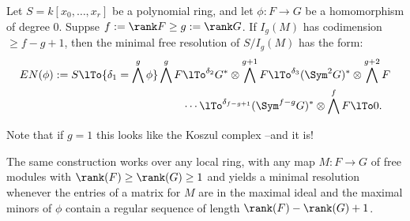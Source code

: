 \begin{theorem}\label{Eagon-Northcott}\label{E-N}
 Let $S = k[x_0,\dots, x_r]$ be a polynomial ring,  and let 
 $\phi: F  \to G$ be a homomorphism of degree 0. Suppse $f := \rank F\geq  g:= \rank G$. If $I_g(M)$ has codimension $\geq f-g+1$, then the minimal free resolution of $S/I_g(M)$ has the form:
\begin{align*}
EN(\phi) := 
S \lTo{\delta_{1}=\bigwedge^g \phi} 
 \bigwedge^g F
 &\lTo^{\delta_{2}}
 G^*\otimes \bigwedge^{g+1} F  \lTo^{\delta_{3}}
  (\Sym^2G)^*\otimes\bigwedge^{g+2}F\\  
&\cdots\lTo^{\delta_{f-g+1}} 
(\Sym^{f-g}G)^*\otimes\bigwedge^fF 
 \lTo 0.
\end{align*}
\end{theorem}

Note that if $g = 1$ this looks like the Koszul complex --and it is!

The same construction works over any local ring, with any map $M: F\to G$ of free modules
with $\rank(F) \geq \rank(G) \geq 1$
and yields a minimal resolution whenever the entries of a matrix for $M$ are in the maximal
ideal and the maximal minors of $\phi$ contain a regular sequence of length $\rank(F) - \rank(G)+1$.

